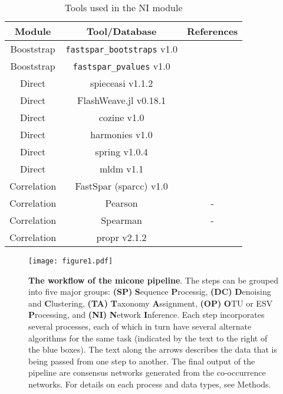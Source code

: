   \begin{table}[h]
    \centering
    \small
    \begin{tabular}{|c|c|c|}
      \hline
      \textbf{Module} & \textbf{Tool/Database} & \textbf{References} \\
      \hline
      Booststrap & \texttt{fastspar\_bootstraps} v1.0 & \cite{Watts2018} \\
      Booststrap & \texttt{fastspar\_pvalues} v1.0 & \cite{Watts2018} \\
      \hline
      Direct & \ac{spieceasi} v1.1.2 & \cite{Kurtz2015} \\
      Direct & FlashWeave.jl v0.18.1 & \cite{tackmannRapidInferenceDirect2019} \\
      Direct & \ac{cozine} v1.0 & \cite{haCompositionalZeroinflatedNetwork2020a} \\
      Direct & \ac{harmonies} v1.0 & \cite{jiangHARMONIESHybridApproach2020} \\
      Direct & \ac{spring} v1.0.4 & \cite{yoonMicrobialNetworksSPRING2019} \\
      Direct & \ac{mldm} v1.1 & \cite{Yang2017} \\
      \hline
      Correlation & FastSpar (\ac{sparcc}) v1.0 & \cite{Watts2018} \\
      Correlation & Pearson & - \\
      Correlation & Spearman & - \\
      Correlation & propr v2.1.2 & \cite{quinnProprRpackageIdentifying2017} \\
      \hline
    \end{tabular}
    \caption{Tools used in the NI module}
    \label{tab:ni_tools}
  \end{table}


  \FloatBarrier
  \newpage

  \begin{figure}[h]
    \centering
    \texttt{[image: figure1.pdf]}
  \end{figure}
  \begin{figure}[ht!]
    \centering
    \caption{
      \textbf{The workflow of the \ac{micone} pipeline}.
      The steps can be grouped into five major groups: \textbf{(SP)} \textbf{S}equence \textbf{P}rocessig, \textbf{(DC)} \textbf{D}enoising and \textbf{C}lustering, \textbf{(TA)} \textbf{T}axonomy \textbf{A}ssignment, \textbf{(OP)} \textbf{O}TU or ESV \textbf{P}rocessing, and \textbf{(NI)} \textbf{N}etwork \textbf{I}nference.
      Each step incorporates several processes, each of which in turn have several alternate algorithms for the same task (indicated by the text to the right of the blue boxes).
      The text along the arrows describes the data that is being passed from one step to another.
      The final output of the pipeline are consensus networks generated from the co-occurrence networks.
      For details on each process and data types, see Methods.
    }
    \label{fig:figure1}
  \end{figure}

